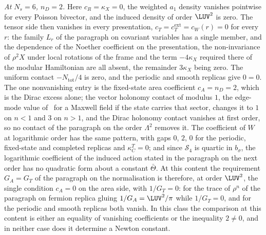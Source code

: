 \emph{At \(N_s=6\), \(n_D=2\).} Here \(c_R=\kappa_X=0\), the weighted \(a_1\) density vanishes pointwise for every Poisson bivector, and the induced density of order \(\LUV^2\) is zero. The tensor side then vanishes in every presentation, \(c_T=c_T^{\mathrm{ext}}=c_W(r)=0\) for every \(r\): the family \(L_r\) of the paragraph on covariant variables has a single member, and the dependence of the Noether coefficient on the presentation, the non-invariance of \(\rho^2X\) under local rotations of the frame and the term \(-4\kappa_X\) required there of the modular Hamiltonian are all absent, the remainder \(3\kappa_X\) being zero. The uniform contact \(-N_{\mathrm{tot}}/4\) is zero, and the periodic and smooth replicas give \(0=0\). The one nonvanishing entry is the fixed-state area coefficient \(c_A=n_D=2\), which is the Dirac excess alone; the vector holonomy contact of modulus \(1\), the edge-mode value of~\cite{DonnellyWall2016} for a Maxwell field if the state carries that sector, changes it to \(1\) on \(n<1\) and \(3\) on \(n>1\), and the Dirac holonomy contact vanishes at first order, so no contact of the paragraph on the order \(\Lambda^2\) removes it. The coefficient of \(W\) at logarithmic order has the same pattern, with gaps \(0\), \(2\), \(0\) for the periodic, fixed-state and completed replicas and \(\kappa_C^T=0\); and since \(\mathcal S_4\) is quartic in \(b_\sigma\), the logarithmic coefficient of the induced action stated in the paragraph on the next order has no quadratic form about a constant \(\bar\Theta\). At this content the requirement \(G_A=G_T\) of the paragraph on the normalisation is therefore, at order \(\LUV^2\), the single condition \(c_A=0\) on the area side, with \(1/G_T=0\): for the trace of \(\rho^n\) of the paragraph on fermion replica gluing \(1/G_A=\LUV^2/\pi\) while \(1/G_T=0\), and for the periodic and smooth replicas both vanish. In this class the comparison at this content is either an equality of vanishing coefficients or the inequality \(2\neq0\), and in neither case does it determine a Newton constant.

